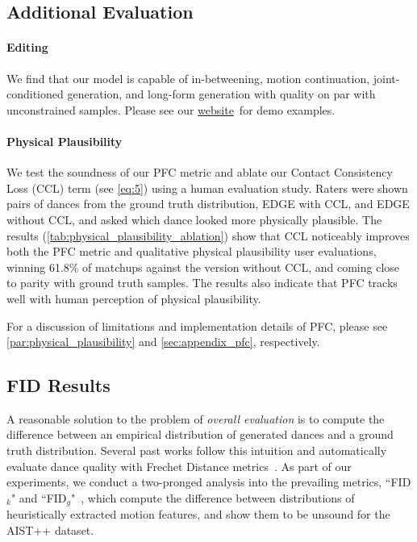 \documentclass[10pt,twocolumn,letterpaper]{article}
\newcommand{\websitelink}{https://edge-dance.github.io/}
\newcommand{\website}{\href{\websitelink}{website}}
\begin{document}
\subsection{Additional Evaluation}

\paragraph{Editing}

We find that our model is capable of in-betweening, motion continuation, joint-conditioned generation, and long-form generation with quality on par with unconstrained samples.
Please see our \website ~for demo examples.

\vspace{-10pt}
\paragraph{Physical Plausibility}

We test the soundness of our PFC metric and ablate our Contact Consistency Loss (CCL) term (see \cref{eq:5}) using a human evaluation study.
Raters were shown pairs of dances from the ground truth distribution, EDGE with CCL, and EDGE without CCL, and asked which dance looked more physically plausible.
The results (\cref{tab:physical_plausibility_ablation}) show that CCL noticeably improves both the PFC metric and qualitative physical plausibility user evaluations, winning 61.8\% of matchups against the version without CCL, and coming close to parity with ground truth samples.
The results also indicate that PFC tracks well with human perception of physical plausibility.

For a discussion of limitations and implementation details of PFC, please see \cref{par:physical_plausibility} and \cref{sec:appendix_pfc}, respectively.

\subsection{FID Results}
A reasonable solution to the problem of \textit{overall evaluation} is to compute the difference between an empirical distribution of generated dances and a ground truth distribution.
Several past works follow this intuition and automatically evaluate dance quality with Frechet Distance metrics~\cite{li2021ai,li2020learning,siyao2022bailando}. As part of our experiments, we conduct a two-pronged analysis into the prevailing metrics, ``FID$_k$" and ``FID$_g$"~\cite{li2021ai}, which compute the difference between distributions of heuristically extracted motion features, and show them to be unsound for the AIST++ dataset.
\vspace{-10pt}
\end{document}
